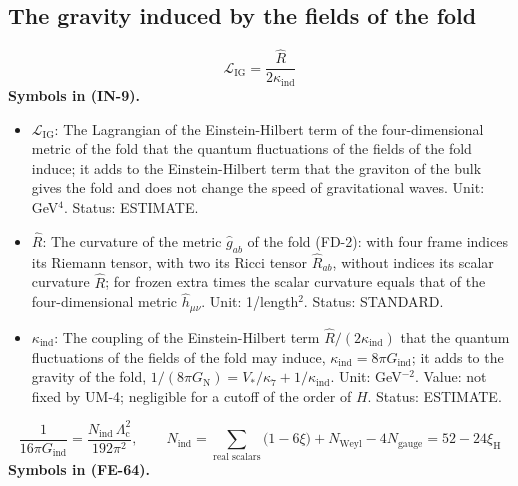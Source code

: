 \documentclass[
  10pt,
]{article}
\providecommand{\tightlist}{%
  \setlength{\itemsep}{0pt}\setlength{\parskip}{0pt}}
\begin{document}
\hypertarget{the-gravity-induced-by-the-fields-of-the-fold}{%
\subsection{The gravity induced by the fields of the
fold}\label{the-gravity-induced-by-the-fields-of-the-fold}}

\[
\mathcal{L}_{\mathrm{IG}} = \frac{\hat R}{2\kappa_{\mathrm{ind}}} \tag{IN-9}
\] \textbf{Symbols in (IN-9).}

\begin{itemize}
\tightlist
\item
  \(\mathcal{L}_{\mathrm{IG}}\): The Lagrangian of the Einstein-Hilbert
  term of the four-dimensional metric of the fold that the quantum
  fluctuations of the fields of the fold induce; it adds to the
  Einstein-Hilbert term that the graviton of the bulk gives the fold and
  does not change the speed of gravitational waves. Unit: GeV\(^4\).
  Status: ESTIMATE.
\item
  \(\hat R\): The curvature of the metric \(\hat g_{ab}\) of the fold
  (FD-2): with four frame indices its Riemann tensor, with two its Ricci
  tensor \(\hat R_{ab}\), without indices its scalar curvature
  \(\hat R\); for frozen extra times the scalar curvature equals that of
  the four-dimensional metric \(\hat h_{\mu\nu}\). Unit: 1/length\(^2\).
  Status: STANDARD.
\item
  \(\kappa_{\mathrm{ind}}\): The coupling of the Einstein-Hilbert term
  \(\hat R/(2\kappa_{\mathrm{ind}})\) that the quantum fluctuations of
  the fields of the fold may induce,
  \(\kappa_{\mathrm{ind}} = 8\pi G_{\mathrm{ind}}\); it adds to the
  gravity of the fold,
  \(1/(8\pi G_{\mathrm{N}}) = V_*/\kappa_7 + 1/\kappa_{\mathrm{ind}}\).
  Unit: GeV\(^{-2}\). Value: not fixed by UM-4; negligible for a cutoff
  of the order of \(H\). Status: ESTIMATE.
\end{itemize}

\[
\frac{1}{16\pi G_{\mathrm{ind}}} = \frac{N_{\mathrm{ind}}\,\Lambda_{\mathrm{c}}^2}{192\pi^2},\qquad
N_{\mathrm{ind}} = \sum_{\text{real scalars}}\big(1 - 6\xi\big) + N_{\mathrm{Weyl}} - 4N_{\mathrm{gauge}} = 52 - 24\xi_{\mathrm{H}} \tag{FE-64}
\] \textbf{Symbols in (FE-64).}
\end{document}
